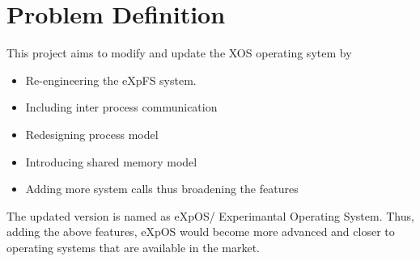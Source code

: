 \chapter{Problem Definition}
\label{chap1}
  This project aims to modify and update the XOS operating sytem  by
\begin{itemize}
\item Re-engineering the eXpFS system. 
\item Including inter process communication
\item Redesigning process model 
\item Introducing shared memory model 
\item Adding more system calls thus broadening the features
\end {itemize}
The updated version is named as eXpOS/ Experimantal Operating System. 
Thus, adding the above features, eXpOS would become more advanced and closer to operating systems that are available in the market.

